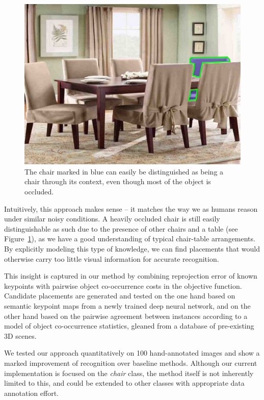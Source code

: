 \documentclass[10pt,twocolumn,letterpaper]{article}
\begin{document}
\begin{figure}
    \includegraphics[width=\linewidth]{figures/occlusion_example/occlusion_example}
    \caption[Context example]{The chair marked in blue can easily be distinguished as being a chair through its context,
             even though most of the object is occluded.}
    \label{fig:ch4:occlusion_example}
\end{figure}

Intuitively, this approach makes sense -- it matches the way we as humans
reason under similar noisy conditions. A heavily occluded chair is still easily
distinguishable as such due to the presence of other chairs and a table (see
Figure~\ref{fig:ch4:occlusion_example}), as we have a good understanding of
typical chair-table arrangements. By explicitly modeling this type of
knowledge, we can find placements that would otherwise carry too little visual
information for accurate recognition.

This insight is captured in our method by combining reprojection error of known
keypoints with pairwise object co-occurrence costs in the objective function.
Candidate placements are generated and tested on the one hand based on semantic
keypoint maps from a newly trained deep neural network, and on the other hand
based on the pairwise agreement between instances according to a model of
object co-occurrence statistics, gleaned from a database of pre-existing 3D scenes.

We tested our approach quantitatively on 100 hand-annotated images and show a
marked improvement of recognition over baseline methods. Although our current
implementation is focused on the \emph{chair} class, the method itself is not
inherently limited to this, and could be extended to other classes with
appropriate data annotation effort.
\end{document}
